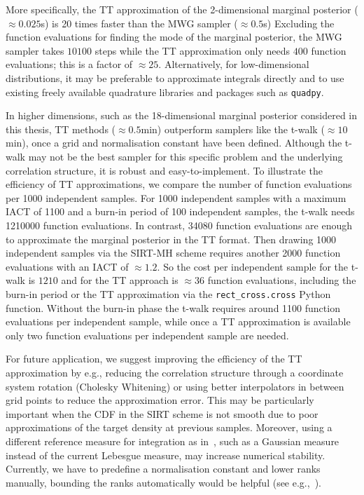 More specifically, the TT approximation of the 2-dimensional marginal posterior ($\approx0.025$s) is 20 times faster than the MWG sampler ($\approx0.5$s)
Excluding the function evaluations for finding the mode of the marginal posterior, the MWG sampler takes $10100$ steps while the TT approximation only needs $400$ function evaluations; this is a factor of $\approx25$.
Alternatively, for low-dimensional distributions, it may be preferable to approximate integrals directly and to use existing freely available quadrature libraries and packages such as \texttt{quadpy}.

In higher dimensions, such as the 18-dimensional marginal posterior considered in this thesis, TT methods ($\approx0.5$min) outperform samplers like the t-walk ($\approx 10$min), once a grid and normalisation constant have been defined.
Although the t-walk may not be the best sampler for this specific problem and the underlying correlation structure, it is robust and easy-to-implement.
To illustrate the efficiency of TT approximations, we compare the number of function evaluations per 1000 independent samples.
For 1000 independent samples with a maximum IACT of 1100 and a burn-in period of 100 independent samples, the t-walk needs 1210000 function evaluations. 
In contrast, 34080 function evaluations are enough to approximate the marginal posterior in the TT format.
Then drawing 1000 independent samples via the SIRT-MH scheme requires another 2000 function evaluations with an IACT of $\approx 1.2$.
So the cost per independent sample for the t-walk is $1210$ and for the TT approach is $\approx 36$ function evaluations, including the burn-in period or the TT approximation via the \texttt{rect\_cross.cross} Python function.
Without the burn-in phase the t-walk requires around 1100 function evaluations per independent sample, while once a TT approximation is available only two function evaluations per independent sample are needed.

For future application, we suggest improving the efficiency of the TT approximation by e.g., reducing the correlation structure through a coordinate system rotation (Cholesky Whitening) or using better interpolators in between grid points to reduce the approximation error.
This may be particularly important when the CDF in the SIRT scheme is not smooth due to poor approximations of the target density at previous samples.  
Moreover, using a different reference measure for integration as in~\cite{cui2022deep}, such as a Gaussian measure instead of the current Lebesgue measure, may increase numerical stability.
Currently, we have to predefine a normalisation constant and lower ranks manually, bounding the ranks automatically would be helpful (see e.g.,~\cite{Rohrbach2022tterror}).



